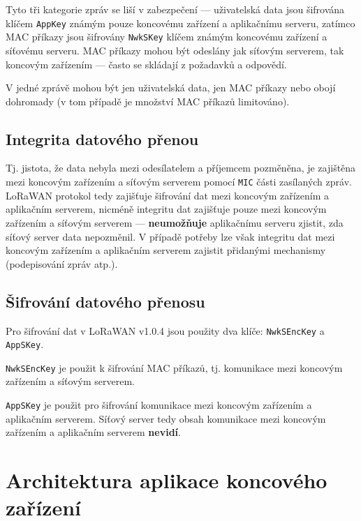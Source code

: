     Tyto tři kategorie zpráv se liší v zabezpečení --- uživatelská data jsou 
    šifrována klíčem \texttt{AppKey} známým pouze koncovému zařízení a aplikačnímu serveru,
    zatímco MAC příkazy jsou šifrovány \texttt{NwkSKey} klíčem známým koncovému zařízení a 
    síťovému serveru. MAC příkazy mohou být odeslány jak síťovým serverem, tak
    koncovým zařízením --- často se skládají z požadavků a odpovědí.

    V jedné zprávě mohou být jen uživatelská data, jen MAC příkazy nebo obojí 
    dohromady (v tom případě je množství MAC příkazů limitováno).

    \subsection{Integrita datového přenou}

        Tj. jistota, že data nebyla mezi odesílatelem a příjemcem pozměněna,
        je zajištěna mezi koncovým zařízením a síťovým serverem pomocí
        \texttt{MIC} části zasílaných zpráv.
        LoRaWAN protokol tedy zajišťuje šifrování dat mezi koncovým zařízením 
        a aplikačním serverem, nicméně integritu dat zajišťuje pouze mezi
        koncovým zařízením a síťovým serverem --- \textbf{neumožňuje} 
        aplikačnímu serveru zjistit, zda síťový server data nepozměnil.
        V případě potřeby lze však integritu dat mezi koncovým zařízením a aplikačním
        serverem zajistit přidanými mechanismy (podepisování zpráv atp.).

    \subsection{Šifrování datového přenosu}

        Pro šifrování dat v LoRaWAN v1.0.4 jsou použity dva klíče: 
        \texttt{NwkSEncKey} a    \texttt{AppSKey}.

        \texttt{NwkSEncKey} je použit k šifrování MAC příkazů, tj. komunikace 
        mezi koncovým zařízením a síťovým serverem.
        
        \texttt{AppSKey} je použit pro šifrování komunikace mezi koncovým
        zařízením a aplikačním serverem. Síťový server tedy obsah komunikace 
        mezi koncovým zařízením a aplikačním serverem \textbf{nevidí}.        

\section{Architektura aplikace koncového zařízení}
    \label{subsubsec:LoRaWAN_node_arch}

